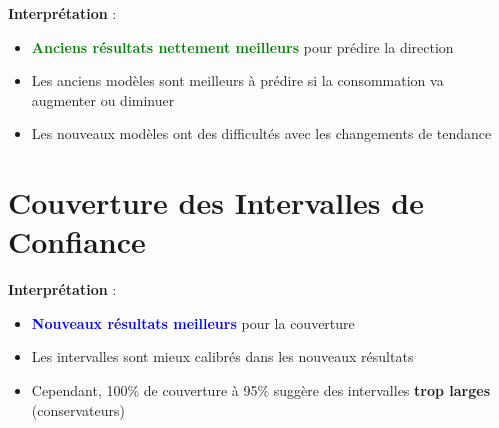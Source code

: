 \documentclass[12pt,a4paper]{article}
\begin{document}
\textbf{Interprétation} :
\begin{itemize}
    \item \textcolor{green}{\textbf{Anciens résultats nettement meilleurs}} pour prédire la direction
    \item Les anciens modèles sont meilleurs à prédire si la consommation va augmenter ou diminuer
    \item Les nouveaux modèles ont des difficultés avec les changements de tendance
\end{itemize}

\section{Couverture des Intervalles de Confiance}

\begin{table}[h]
\centering
\caption{Comparaison couverture des intervalles}
\label{tab:couverture}
\end{table}

\textbf{Interprétation} :
\begin{itemize}
    \item \textcolor{blue}{\textbf{Nouveaux résultats meilleurs}} pour la couverture
    \item Les intervalles sont mieux calibrés dans les nouveaux résultats
    \item Cependant, 100\% de couverture à 95\% suggère des intervalles \textbf{trop larges} (conservateurs)
\end{itemize}
\end{document}
